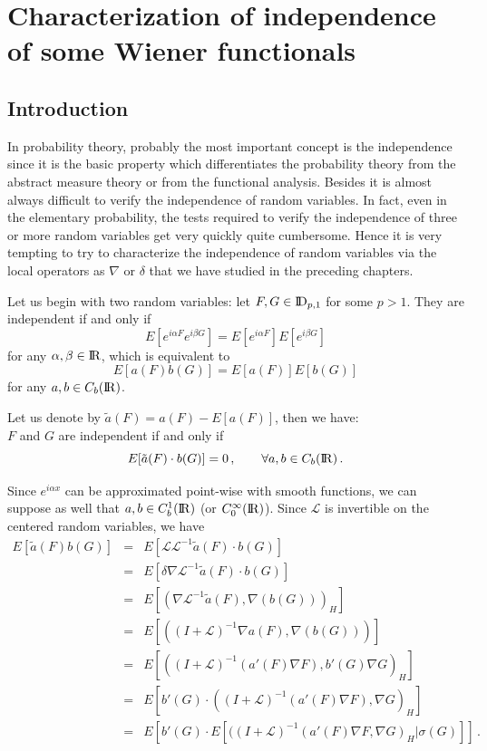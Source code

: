\documentclass[12pt,a4paper]{book}
\newcommand{\DD}{{\rm I\!D}}
\newcommand{\R}{{\rm I\!R}}
\begin{document}


\chapter{Characterization of independence of some Wiener functionals}
\label{ch.indep}

\section*{Introduction }

In probability theory, probably the   most important concept is the
independence since it is the basic property which differentiates the
probability theory from the abstract measure theory or from the
functional analysis. Besides it is almost always difficult to verify
 the independence of random variables. In fact, even in the
elementary probability, the tests required to verify the independence
of three or more random
variables get very quickly quite cumbersome. Hence it is very tempting
to try to  characterize the independence of random variables via the local
 operators as $\nabla$ or $\delta$ that we have studied  in the
 preceding chapters.

Let us begin with two random variables: let $F,G\in \DD_{p,1}$ for some $p>1$.
They are independent if and only if
$$
E[e^{i\alpha F}e^{i\beta G}]=E[e^{i\alpha F}]E[e^{i\beta G}]
$$
for any $\alpha,\beta\in\R$, which is equivalent to
$$
E[a(F)b(G)]=E[a(F)]E[b(G)]
$$
for any $a,b\in C_b(\R)$.

Let us denote by $\tilde{a}(F)=a(F)-E[a(F)]$, then we have:\\
 $F$ and $G$ are independent if and only if
$$
E[\tilde{a}(F)\cdot b(G)]=0\,,\qquad \forall a,b\in C_b(\R)\,.
$$

\noindent
Since $e^{i\alpha x}$ can be approximated point-wise with smooth functions, we
can suppose as well that $a,b\in C_b^1(\R)$ (or $C_0^\infty(\R)$). Since
$\mathcal L$ is invertible on the centered random variables, we have
\begin{eqnarray*}
E[\tilde{a}(F)b(G)] & = & E[{\mathcal {L L}}^{-1}\tilde{a}(F)\cdot b(G)] \\
& = & E[\delta\nabla{\mathcal L}^{-1}\tilde{a}(F)\cdot b(G)] \\
& = & E[(\nabla{\mathcal L}^{-1}\tilde{a}(F),\nabla(b(G)))_H] \\
& = & E[((I+{\mathcal L})^{-1}\nabla a(F),\nabla(b(G)))] \\
& = & E[((I+{\mathcal L})^{-1}(a'(F)\nabla F),b'(G)\nabla G)_H] \\
& = & E[b'(G)\cdot((I+{\mathcal L})^{-1}(a'(F)\nabla F),\nabla G)_H] \\
& = & E[b'(G)\cdot
          E[((I+{\mathcal L})^{-1}(a'(F)\nabla F,\nabla G)_H|\sigma(G)]]\,.
\end{eqnarray*}
\end{document}
